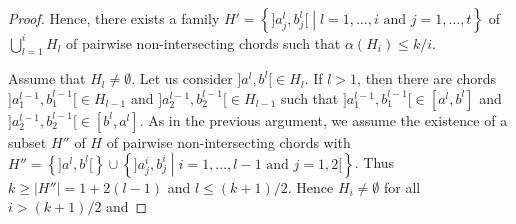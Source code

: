 \documentclass{article}
\begin{document}
\begin{proof}
        Hence, there exists a
        family $H' = \left\{]a^{l}_{j}, b^{l}_{j}[
        \middle| l = 1, \ldots, i \text{ and }
        j = 1, \ldots, t\right\}$ of
        $\bigcup_{l = 1}^{i} H_{l}$
        of pairwise non-intersecting
        chords such that $\alpha\left(H_{i}\right) \leq k/i$.

        Assume that $H_{l} \neq \emptyset$.
        Let us consider $]a^{l}, b^{l}[
        \in H_{l}$. If $l > 1$,
        then there are chords
        $]a^{l-1}_{1}, b^{l-1}_{1}[ \in H_{l-1}$
        and $]a^{l-1}_{2}, b^{l-1}_{2}[ \in H_{l-1}$ 
        such that $]a^{l-1}_{1}, b^{l-1}_{1}[
        \in [a^{l}, b^{l}]$ and
        $]a^{l-1}_{2}, b^{l-1}_{2}[ \in [b^{l}, a^{l}]$.
        As in the previous argument,
        we assume the existence of a
        subset $H''$ of $H$ of
        pairwise non-intersecting chords
        with $H'' = \left\{]a^{l}, b^{l}[\right\}
        \cup \left\{]a^{i}_{j}, b^{i}_{j}
        \middle| i = 1, \ldots, l-1
        \text{ and } j = 1, 2[\right\}$.
        Thus $k \geq \left|H''\right|
        = 1 + 2\left(l-1\right)$
        and $l \leq (k+1)/2$.
        Hence $H_{i} \neq \emptyset$ 
        for all $i > (k+1)/2$
        and 
    \end{proof}
\end{document}
